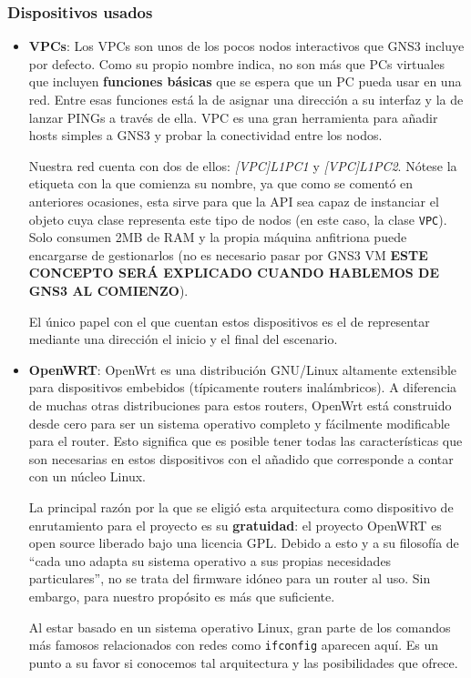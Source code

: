 \subsubsection{Dispositivos usados}
\begin{itemize}
\item \textbf{VPCs}: Los VPCs son unos de los pocos nodos interactivos que GNS3 incluye por defecto. Como su propio nombre indica, no son más que PCs virtuales que incluyen \textbf{funciones básicas} que se espera que un PC pueda usar en una red. Entre esas funciones está la de asignar una dirección a su interfaz y la de lanzar PINGs a través de ella. VPC es una gran herramienta para añadir hosts simples a GNS3 y probar la conectividad entre los nodos\cite{bookgns}.

Nuestra red cuenta con dos de ellos: \textit{[VPC]L1PC1} y \textit{[VPC]L1PC2}. Nótese la etiqueta con la que comienza su nombre, ya que como se comentó en anteriores ocasiones, esta sirve para que la API sea capaz de instanciar el objeto cuya clase representa este tipo de nodos (en este caso, la clase \texttt{VPC}). Solo consumen 2MB de RAM y la propia máquina anfitriona puede encargarse de gestionarlos (no es necesario pasar por GNS3 VM \textbf{ESTE CONCEPTO SERÁ EXPLICADO CUANDO HABLEMOS DE GNS3 AL COMIENZO}).

El único papel con el que cuentan estos dispositivos es el de representar mediante una dirección el inicio y el final del escenario.

\item \textbf{OpenWRT}: OpenWrt es una distribución GNU/Linux altamente extensible para dispositivos embebidos (típicamente routers inalámbricos). A diferencia de muchas otras distribuciones para estos routers, OpenWrt está construido desde cero para ser un sistema operativo completo y fácilmente modificable para el router. Esto significa que es posible tener todas las características que son necesarias en estos dispositivos con el añadido que corresponde a contar con un núcleo Linux\cite{aboutopenwrt}.

La principal razón por la que se eligió esta arquitectura como dispositivo de enrutamiento para el proyecto es su \textbf{gratuidad}: el proyecto OpenWRT es open source liberado bajo una licencia GPL. Debido a esto y a su filosofía de ``cada uno adapta su sistema operativo a sus propias necesidades particulares'', no se trata del firmware idóneo para un router al uso. Sin embargo, para nuestro propósito es más que suficiente.

Al estar basado en un sistema operativo Linux, gran parte de los comandos más famosos relacionados con redes como \texttt{ifconfig} aparecen aquí. Es un punto a su favor si conocemos tal arquitectura y las posibilidades que ofrece.


\end{itemize}
